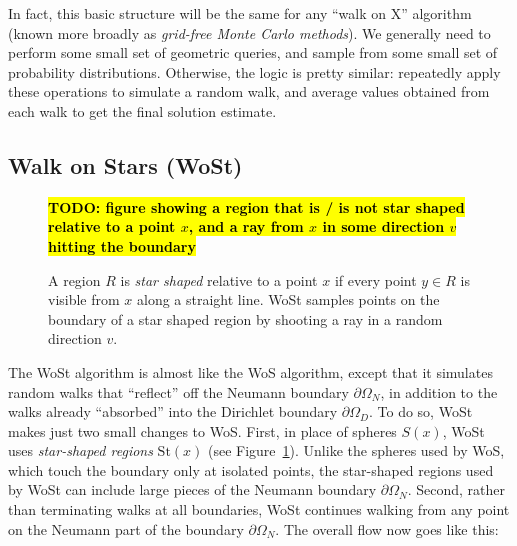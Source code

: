\documentclass{article}
\newcommand{\todo}[1]{\textbf{\hl{TODO: #1}}}
\newcommand{\St}{\text{St}}
\renewcommand{\vec}[1]{#1}
\begin{document}
In fact, this basic structure will be the same for any ``walk on X'' algorithm (known more broadly as \emph{grid-free Monte Carlo methods}).  We generally need to perform some small set of geometric queries, and sample from some small set of probability distributions.  Otherwise, the logic is pretty similar: repeatedly apply these operations to simulate a random walk, and average values obtained from each walk to get the final solution estimate.

\subsection{Walk on Stars (WoSt)}
\label{sec:WalkOnStarsOverview}

\begin{figure}[h!]
   \todo{figure showing a region that is / is not star shaped relative to a point $\vec{x}$, and a ray from $\vec{x}$ in some direction $\vec{v}$ hitting the boundary} 
   \caption{A region \(R\) is \emph{star shaped} relative to a point \(\vec{x}\) if every point \(\vec{y} \in R\) is visible from \(\vec{x}\) along a straight line.  WoSt samples points on the boundary of a star shaped region by shooting a ray in a random direction \(\vec{v}\).\label{fig:StarShapedRegions}}
\end{figure}

The WoSt algorithm is almost like the WoS algorithm, except that it simulates random walks that ``reflect'' off the Neumann boundary \(\partial\Omega_N\), in addition to the walks already ``absorbed'' into the Dirichlet boundary \(\partial\Omega_D\).  To do so, WoSt makes just two small changes to WoS.  First, in place of spheres \(S(\vec{x})\), WoSt uses \emph{star-shaped regions} \(\St(\vec{x})\) (see Figure~\ref{fig:StarShapedRegions}).  Unlike the spheres used by WoS, which touch the boundary only at isolated points, the star-shaped regions used by WoSt can include large pieces of the Neumann boundary \(\partial\Omega_N\).  Second, rather than terminating walks at all boundaries, WoSt continues walking from any point on the Neumann part of the boundary \(\partial\Omega_N\).  The overall flow now goes like this:
\end{document}
